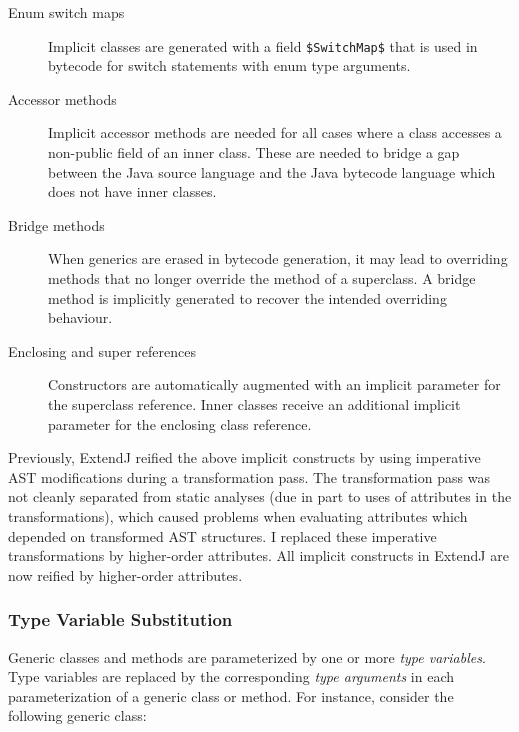 \documentclass[10pt, twoside, openright]{book}
\newcommand{\secref}[1]{Section~\ref{#1}}
\begin{document}
\begin{description}
  \item[Enum switch maps] Implicit classes are generated with a field \verb'$SwitchMap$'
    that is used in bytecode for switch statements with enum type arguments.
  \item[Accessor methods] Implicit accessor methods are needed for all cases where
    a class accesses a non-public field of an inner class. These are needed to
    bridge a gap between the Java source language and the Java bytecode language which does
    not have inner classes.
  \item[Bridge methods] When generics are erased in bytecode generation, it may lead to
    overriding methods that no longer override the method of a superclass. A bridge method
    is implicitly generated to recover the intended overriding behaviour.
  \item[Enclosing and super references]
    Constructors are automatically augmented with an implicit parameter for the superclass
    reference. Inner classes receive an additional implicit parameter for the enclosing
    class reference.
\end{description}

Previously, ExtendJ reified the above implicit constructs by using imperative AST modifications
during a transformation pass.
The transformation pass was not cleanly separated from static analyses
(due in part to uses of attributes in the transformations),
which caused problems when evaluating attributes which depended on
transformed AST structures. I replaced these imperative transformations by higher-order attributes.
All implicit constructs in ExtendJ are now reified by higher-order attributes.


\subsubsection{Type Variable Substitution}

Generic classes and methods are parameterized by one or more \emph{type variables}.  Type variables
are replaced by the corresponding \emph{type arguments} in each parameterization of a generic class
or method.  For instance, consider the following generic class:
\end{document}
